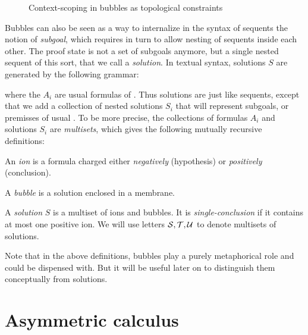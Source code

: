 \begin{figure}
\caption{Context-scoping in bubbles as topological constraints}
\end{figure}

Bubbles can also be seen as a way to internalize in the syntax of sequents the
notion of \emph{subgoal}, which requires in turn to allow nesting of sequents
inside each other. The proof state is not a set of subgoals anymore, but a
single nested sequent of this sort, that we call a \emph{solution}. In textual syntax, solutions $S$ are generated by the
following grammar:
where the $A_i$ are usual formulas of . Thus solutions are just like
sequents, except that we add a collection of nested solutions $S_i$ that will
represent subgoals, or premisses of usual . To be more precise,
the collections of formulas $A_i$ and solutions $S_i$ are \emph{multisets},
which gives the following mutually recursive definitions:
\begin{definition}[Ion]
An \emph{ion} is a formula charged either \emph{negatively} (hypothesis) or
\emph{positively} (conclusion).
\end{definition}
\begin{definition}[Bubble]
A \emph{bubble} is a solution enclosed in a membrane.
\end{definition}
\begin{definition}[Solution]
A \emph{solution} $S$ is a multiset of ions and bubbles. It is
\emph{single-conclusion} if it contains at most one positive ion. We will use
letters $\mathcal{S}, \mathcal{T}, \mathcal{U}$ to denote multisets of
solutions.
\end{definition}
Note that in the above definitions, bubbles play a purely metaphorical role and
could be dispensed with. But it will be useful later on to distinguish them
conceptually from solutions.

\section{Asymmetric calculus}

